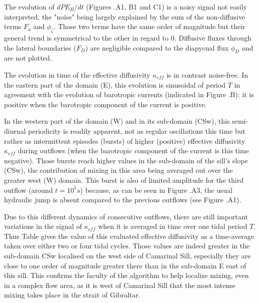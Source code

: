 The evolution of $dPE_B/dt$ (Figures .A1, B1 and C1) is a noisy signal not easily interpreted, the "noise" being largely explained by the sum of the non-diffusive terms $F_a$ and $\phi_{\zeta}$. Those two terms have the same order of magnitude but their general trend is symmetrical to the other in regard to 0. Diffusive fluxes through the lateral boundaries ($F_D$) are negligible compared to the diapycnal flux $\phi_D$ and are not plotted.

The evolution in time of the effective diffusivity $\kappa_{eff}$ is in contrast noise-free. In the eastern part of the domain (E), this evolution is sinusoidal of period $T$ in agreement with the evolution of barotropic currents (indicated in Figure .B): it is positive when the barotropic component of the current is positive.

In the western part of the domain (W) and in its sub-domain (CSw), this semi-diurnal periodicity is readily apparent, not as regular oscillations this time but rather as intermittent episodes (bursts) of higher (positive) effective diffusivity $\kappa_{eff}$ during outflows (when the barotropic component of the current is this time negative). Those bursts reach higher values in the sub-domain of the sill's slope (CSw), the contribution of mixing in this area being averaged out over the greater west (W) domain. This burst is also of limited amplitude for the third outflow (around $t=10^5s$) because, as can be seen in Figure .A3, the usual hydraulic jump is absent compared to the previous outflows (see Figure .A1).

Due to this different dynamics of consecutive outflows, there are still important variations in the signal of $\kappa_{eff}$ when it is averaged in time over one tidal period $T$. Thus Table  gives the value of this evaluated effective diffusivity as a time-average taken over either two or four tidal cycles. Those values are indeed greater in the sub-domain CSw localised on the west side of Camarinal Sill, especially they are close to one order of magnitude greater there than in the sub-domain E east of this sill. This confirms the faculty of the algorithm to help localize mixing, even in a complex flow area, as it is west of Camarinal Sill that the most intense mixing takes place in the strait of Gibraltar.

